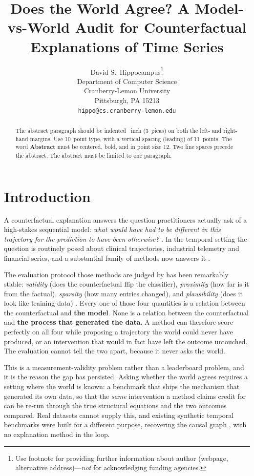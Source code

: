 \documentclass{article}
\title{Does the World Agree? A Model-vs-World Audit for Counterfactual
Explanations of Time Series}
\author{%
  David S.~Hippocampus\thanks{Use footnote for providing further information
    about author (webpage, alternative address)---\emph{not} for acknowledging
    funding agencies.} \\
  Department of Computer Science\\
  Cranberry-Lemon University\\
  Pittsburgh, PA 15213 \\
  \texttt{hippo@cs.cranberry-lemon.edu} \\
}
\begin{document}
\maketitle


\begin{abstract}
  The abstract paragraph should be indented ~inch (3~picas) on both the left- and right-hand margins. Use 10~point type, with a vertical spacing (leading) of 11~points. The word \textbf{Abstract} must be centered, bold, and in point size 12. Two line spaces precede the abstract. The abstract must be limited to one paragraph.
\end{abstract}

\section{Introduction}

A counterfactual explanation answers the question practitioners actually ask of a high-stakes sequential model: \emph{what would have had to be different in this trajectory for the prediction to have been otherwise?} \citep{wachter2017counterfactual}. In the temporal setting the question is routinely posed about clinical trajectories, industrial telemetry and financial series, and a substantial family of methods now answers it \citep{delaney2021nativeguide,ates2021comte,hollig2022tsevo,li2024mcels,paredescetina2025confetti,yan2023counts}.

The evaluation protocol those methods are judged by has been remarkably stable: \emph{validity} (does the counterfactual flip the classifier), \emph{proximity} (how far is it from the factual), \emph{sparsity} (how many entries changed), and \emph{plausibility} (does it look like training data) \citep{pawelczyk2021carla,hollig2023xtscbench,nguyen2024amee}. Every one of those four quantities is a relation between the counterfactual and \textbf{the model}. None is a relation between the counterfactual and \textbf{the process that generated the data}. A method can therefore score perfectly on all four while proposing a trajectory the world could never have produced, or an intervention that would in fact have left the outcome untouched. The evaluation cannot tell the two apart, because it never asks the world.

This is a measurement-validity problem rather than a leaderboard problem, and it is the reason the gap has persisted. Asking whether the world agrees requires a setting where the world is known: a benchmark that ships the mechanism that generated its own data, so that the \emph{same} intervention a method claims credit for can be re-run through the true structural equations and the two outcomes compared. Real datasets cannot supply this, and existing synthetic temporal benchmarks were built for a different purpose, recovering the causal graph \citep{cheng2024causaltime,herdeanu2025causaldynamics,ferdous2025timegraph}, with no explanation method in the loop.
\end{document}
